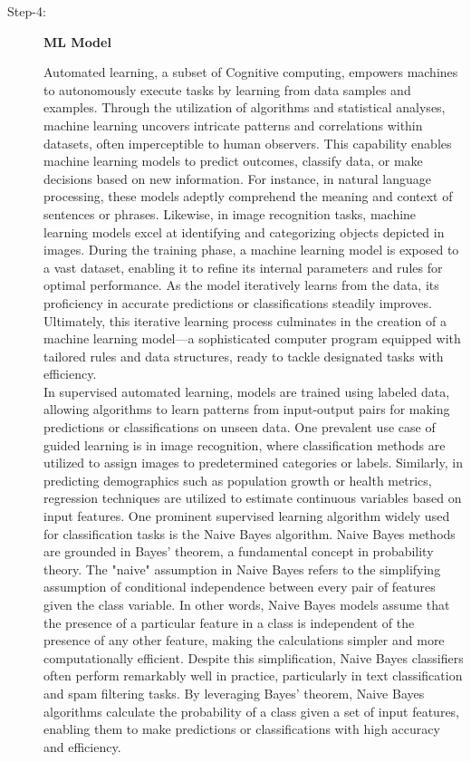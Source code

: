 \begin{description}
\item[Step-4:]\textbf{ML Model}

Automated learning, a subset of Cognitive computing, empowers machines to autonomously execute tasks by learning from data samples and examples. Through the utilization of algorithms and statistical analyses, machine learning uncovers intricate patterns and correlations within datasets, often imperceptible to human observers. This capability enables machine learning models to predict outcomes, classify data, or make decisions based on new information. For instance, in natural language processing, these models adeptly comprehend the meaning and context of sentences or phrases. Likewise, in image recognition tasks, machine learning models excel at identifying and categorizing objects depicted in images. During the training phase, a machine learning model is exposed to a vast dataset, enabling it to refine its internal parameters and rules for optimal performance. As the model iteratively learns from the data, its proficiency in accurate predictions or classifications steadily improves. Ultimately, this iterative learning process culminates in the creation of a machine learning model—a sophisticated computer program equipped with tailored rules and data structures, ready to tackle designated tasks with efficiency.
\\
In supervised automated learning, models are trained using labeled data, allowing algorithms to learn patterns from input-output pairs for making predictions or classifications on unseen data. One prevalent use case of guided learning is in image recognition, where classification methods are utilized to assign images to predetermined categories or labels. Similarly, in predicting demographics such as population growth or health metrics, regression techniques are utilized to estimate continuous variables based on input features. One prominent supervised learning algorithm widely used for classification tasks is the Naive Bayes algorithm. Naive Bayes methods are grounded in Bayes' theorem, a fundamental concept in probability theory. The "naive" assumption in Naive Bayes refers to the simplifying assumption of conditional independence between every pair of features given the class variable. In other words, Naive Bayes models assume that the presence of a particular feature in a class is independent of the presence of any other feature, making the calculations simpler and more computationally efficient. Despite this simplification, Naive Bayes classifiers often perform remarkably well in practice, particularly in text classification and spam filtering tasks. By leveraging Bayes' theorem, Naive Bayes algorithms calculate the probability of a class given a set of input features, enabling them to make predictions or classifications with high accuracy and efficiency.

\end{description}
